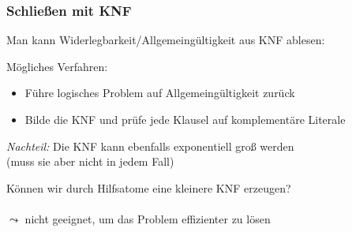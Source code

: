 \documentclass[aspectratio=1610,onlymath]{beamer}
\let\beameroriginaldoublebackslash\\
\let\\=\beameroriginaldoublebackslash
\begin{document}
\begin{frame}[t]\frametitle{Schließen mit KNF}

Man kann Widerlegbarkeit/Allgemeingültigkeit aus KNF ablesen:\medskip


Mögliches Verfahren:
\begin{itemize}
\item Führe logisches Problem auf Allgemeingültigkeit zurück
\item Bilde die KNF und prüfe jede Klausel auf komplementäre Literale
\end{itemize}
\emph{Nachteil:} Die KNF kann ebenfalls exponentiell groß werden\\ (muss sie aber nicht in jedem Fall)
\bigskip\pause

\alert{Können wir durch Hilfsatome eine kleinere KNF erzeugen?}\\\pause
{}\\
$\leadsto$ nicht geeignet, um das Problem effizienter zu lösen

\end{frame}
\end{document}

